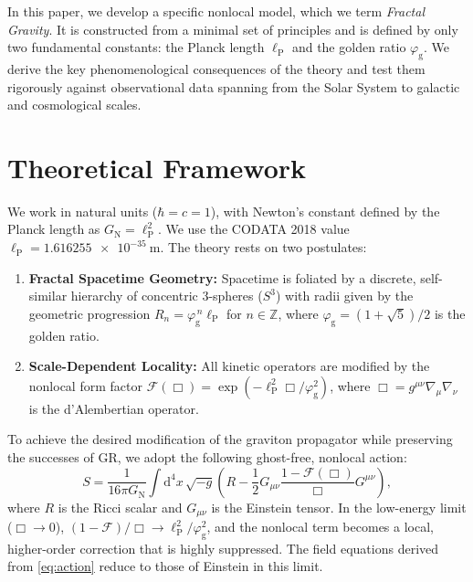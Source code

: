 \documentclass[
  10pt,prd,aps,twocolumn,superscriptaddress,
  nofootinbib,floatfix,tightenlines
]{revtex4-2}
\newcommand{\GN}{G_{\mathrm{N}}}
\newcommand{\ellP}{\ell_{\mathrm{P}}}
\newcommand{\phig}{\varphi_{\mathrm{g}}} %
\newcommand{\Fop}{\mathscr{F}}
\newcommand{\BOX}{\Box}
\newcommand{\dd}{\mathrm{d}} %
\begin{document}
In this paper, we develop a specific nonlocal model, which we term \emph{Fractal Gravity}. It is constructed from a minimal set of principles and is defined by only two fundamental constants: the Planck length \(\ellP\) and the golden ratio \(\phig\). We derive the key phenomenological consequences of the theory and test them rigorously against observational data spanning from the Solar System to galactic and cosmological scales.

\section{Theoretical Framework}
\label{sec:action}
We work in natural units (\(\hbar = c = 1\)), with Newton's constant defined by the Planck length as \(\GN = \ellP^2\). We use the CODATA 2018 value \(\ellP = \SI{1.616255e-35}{\meter}\). The theory rests on two postulates:

\begin{enumerate}[label=\textbf{P\arabic*.}, ref=P\arabic*, leftmargin=*, align=left]
  \item \textbf{Fractal Spacetime Geometry:} Spacetime is foliated by a discrete, self-similar hierarchy of concentric 3-spheres (\(S^3\)) with radii given by the geometric progression \(R_n=\phig^{\,n}\ellP\) for \(n\in\mathbb Z\), where \(\phig=(1+\sqrt5)/2\) is the golden ratio.
  \item \textbf{Scale-Dependent Locality:} All kinetic operators are modified by the nonlocal form factor \(\Fop(\BOX) = \exp(-\ellP^2\BOX/\phig^2)\), where \(\BOX=g^{\mu\nu}\nabla_\mu\nabla_\nu\) is the d'Alembertian operator.
\end{enumerate}

To achieve the desired modification of the graviton propagator while preserving the successes of GR, we adopt the following ghost-free, nonlocal action:
\begin{equation}
S=\frac{1}{16\pi\GN}\int\dd^4x\,\sqrt{-g}\left(R-\frac{1}{2}G_{\mu\nu}\frac{1-\Fop(\BOX)}{\BOX}G^{\mu\nu}\right),
\label{eq:action}
\end{equation}
where \(R\) is the Ricci scalar and \(G_{\mu\nu}\) is the Einstein tensor. In the low-energy limit (\(\BOX\to0\)), \((1-\Fop)/\BOX \to \ellP^2/\phig^2\), and the nonlocal term becomes a local, higher-order correction that is highly suppressed. The field equations derived from \cref{eq:action} reduce to those of Einstein in this limit.
\end{document}
